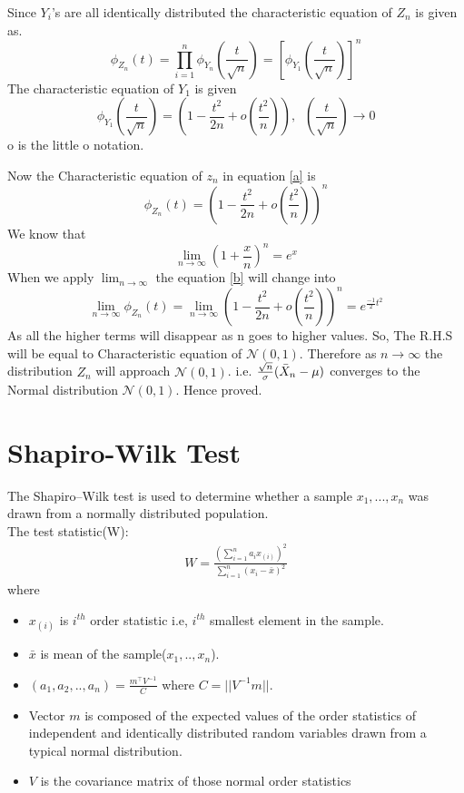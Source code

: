 \documentclass{article}
\begin{document}
Since $Y_i$'s are all identically distributed the characteristic equation of $Z_n$ is given as.
\begin{equation}
    \phi_{Z_n}(t) =\displaystyle \prod_{i=1}^n\phi_{Y_n}\left(\frac{t}{\sqrt{n}}\right) = \left[\phi_{Y_1}\left(\frac{t}{\sqrt{n}}\right)\right]^n
\end{equation}
The characteristic equation of $Y_1$ is given
\begin{equation}
    \phi_{Y_1}\left(\frac{t}{\sqrt{n}}\right) = \left(1-\frac{t^2}{2n} + o\left(\frac{t^2}{n}\right)\right), \;\; \left(\frac{t}{\sqrt{n}}\right)\to 0 \label{b}
\end{equation}
o is the little o notation.

Now the Characteristic equation of $z_n$ in equation \eqref{a} is 
\begin{equation}
    \phi_{Z_n}(t) = \left( 1-\frac{t^2}{2n} + o\left(\frac{t^2}{n}\right) \right)^n
\end{equation}
We know that 
$$\lim_{n\to\infty} \left(1+\frac{x}{n}\right)^n = e^x$$
When we apply $\lim_{n\to\infty}$ the equation \eqref{b} will change into 
\begin{equation}
    \lim_{n\to\infty}\phi_{Z_n}(t) =\lim_{n\to\infty}\left( 1-\frac{t^2}{2n} + o\left(\frac{t^2}{n}\right) \right)^n =  e^{\frac{-1}{2}t^2}
\end{equation}
As all the higher terms will disappear as n goes to higher values.
So, The R.H.S will be equal to Characteristic equation of $\mathcal{N}(0,1)$.
Therefore as $n\to\infty$ the distribution $Z_n$ will approach $\mathcal{N}(0,1)$.
i.e. $\frac{\sqrt{n}}{\sigma}(\Bar{X}_n - \mu) $ converges to the Normal distribution $\mathcal{N}(0,1)$.
Hence proved.

\section{Shapiro-Wilk Test}
The Shapiro–Wilk test is used to determine whether a sample $x_{1},..., x_{n}$ was drawn from a normally distributed population.\\
The test statistic(W):
\begin{align*}
    W=\frac{\left(\sum_{i=1}^{n}a_{i}x_{(i)}\right)^{2}}{\sum_{i=1}^{n}(x_{i}-\bar{x})^{2}}
\end{align*}
where
\begin{itemize}
    \item $x_{(i)}$ is $i^{th}$ order statistic i.e, $i^{th}$ smallest element in the sample.
    \item $\bar{x}$ is mean of the sample($x_{1},..,x_{n}$). 
    \item $(a_{1},a_{2},..,a_{n})=\frac{m^{\top}V^{-1}}{C}$ where $C=||V^{-1}m||$.
    \item Vector $m$ is composed of the expected values of the order statistics of independent and identically distributed random variables drawn from a typical normal distribution.
    \item $V$ is the covariance matrix of those normal order statistics
\end{itemize}
\end{document}
